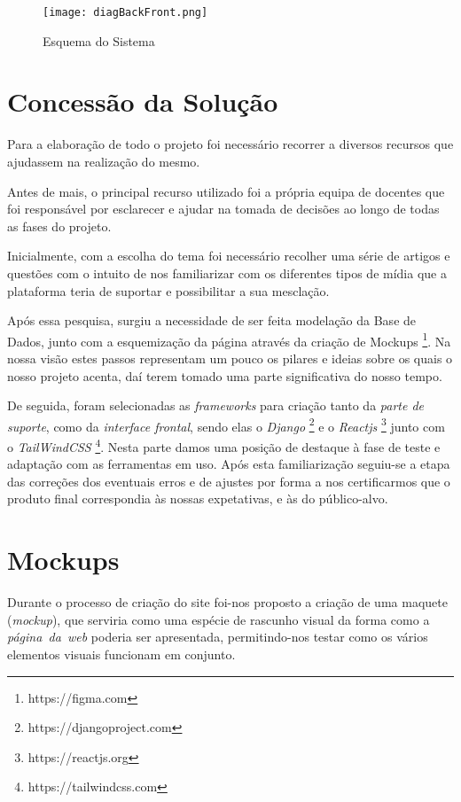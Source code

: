 \documentclass[11pt,a4paper]{report}
\begin{document}
\begin{figure}[h]
    \centering
    \texttt{[image: diagBackFront.png]}
    \caption{Esquema do Sistema}
    \label{fig:sis}
\end{figure}

\chapter{Concessão da Solução}

Para a elaboração de todo o projeto foi necessário recorrer a diversos recursos que ajudassem na realização do mesmo.

Antes de mais, o principal recurso utilizado foi a própria equipa de docentes que foi responsável por esclarecer e ajudar na tomada de decisões ao longo de todas as fases do projeto.

Inicialmente, com a escolha do tema foi necessário recolher uma série de artigos e questões com o intuito de nos familiarizar com os diferentes tipos de mídia que a plataforma teria de suportar e possibilitar a sua mesclação. 

Após essa pesquisa, surgiu a necessidade de ser feita modelação da Base de Dados, junto com a esquemização da página através da criação de Mockups \footnote{https://figma.com}. Na nossa visão estes passos representam um pouco os pilares e ideias sobre os quais o nosso projeto acenta, daí terem tomado uma parte significativa do nosso tempo.

De seguida, foram selecionadas as \emph{frameworks} para criação tanto da \emph{parte de suporte}, como da \emph{interface frontal}, sendo elas o \emph{Django} \footnote{https://djangoproject.com} e o \emph{Reactjs} \footnote{https://reactjs.org} junto com o \emph{TailWindCSS} \footnote{https://tailwindcss.com}. Nesta parte damos uma posição de destaque à fase de teste e adaptação com as ferramentas em uso. Após esta familiarização seguiu-se a etapa das correções dos eventuais erros e de ajustes por forma a nos certificarmos que o produto final correspondia às nossas expetativas, e às do público-alvo.

\chapter{Mockups}

Durante o processo de criação do site foi-nos proposto a criação de uma maquete (\emph{mockup}), que serviria como uma espécie de rascunho visual da forma como a \emph{página\ da\ web} poderia ser apresentada, permitindo-nos testar como os vários elementos visuais funcionam em conjunto.
\end{document}
